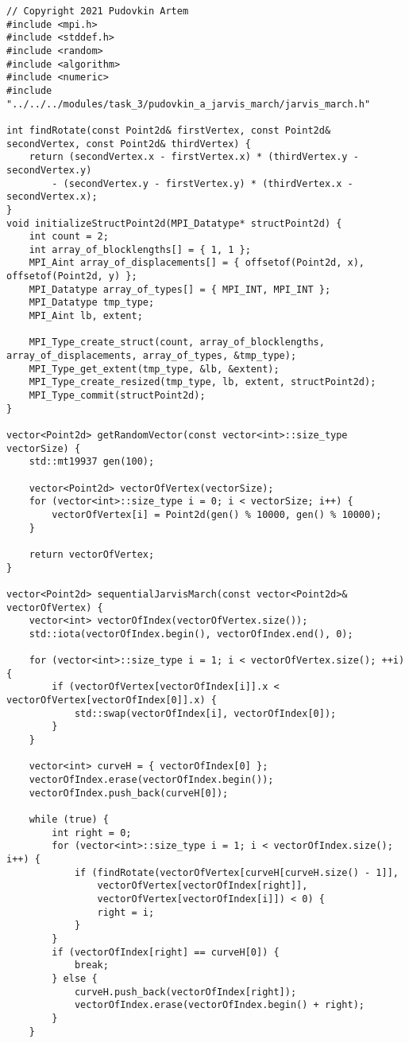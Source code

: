\documentclass{report}
\begin{document}
\begin{lstlisting}
// Copyright 2021 Pudovkin Artem
#include <mpi.h>
#include <stddef.h>
#include <random>
#include <algorithm>
#include <numeric>
#include "../../../modules/task_3/pudovkin_a_jarvis_march/jarvis_march.h"

int findRotate(const Point2d& firstVertex, const Point2d& secondVertex, const Point2d& thirdVertex) {
    return (secondVertex.x - firstVertex.x) * (thirdVertex.y - secondVertex.y)
        - (secondVertex.y - firstVertex.y) * (thirdVertex.x - secondVertex.x);
}
void initializeStructPoint2d(MPI_Datatype* structPoint2d) {
    int count = 2;
    int array_of_blocklengths[] = { 1, 1 };
    MPI_Aint array_of_displacements[] = { offsetof(Point2d, x), offsetof(Point2d, y) };
    MPI_Datatype array_of_types[] = { MPI_INT, MPI_INT };
    MPI_Datatype tmp_type;
    MPI_Aint lb, extent;

    MPI_Type_create_struct(count, array_of_blocklengths, array_of_displacements, array_of_types, &tmp_type);
    MPI_Type_get_extent(tmp_type, &lb, &extent);
    MPI_Type_create_resized(tmp_type, lb, extent, structPoint2d);
    MPI_Type_commit(structPoint2d);
}

vector<Point2d> getRandomVector(const vector<int>::size_type vectorSize) {
    std::mt19937 gen(100);

    vector<Point2d> vectorOfVertex(vectorSize);
    for (vector<int>::size_type i = 0; i < vectorSize; i++) {
        vectorOfVertex[i] = Point2d(gen() % 10000, gen() % 10000);
    }

    return vectorOfVertex;
}

vector<Point2d> sequentialJarvisMarch(const vector<Point2d>& vectorOfVertex) {
    vector<int> vectorOfIndex(vectorOfVertex.size());
    std::iota(vectorOfIndex.begin(), vectorOfIndex.end(), 0);

    for (vector<int>::size_type i = 1; i < vectorOfVertex.size(); ++i) {
        if (vectorOfVertex[vectorOfIndex[i]].x < vectorOfVertex[vectorOfIndex[0]].x) {
            std::swap(vectorOfIndex[i], vectorOfIndex[0]);
        }
    }

    vector<int> curveH = { vectorOfIndex[0] };
    vectorOfIndex.erase(vectorOfIndex.begin());
    vectorOfIndex.push_back(curveH[0]);

    while (true) {
        int right = 0;
        for (vector<int>::size_type i = 1; i < vectorOfIndex.size(); i++) {
            if (findRotate(vectorOfVertex[curveH[curveH.size() - 1]],
                vectorOfVertex[vectorOfIndex[right]],
                vectorOfVertex[vectorOfIndex[i]]) < 0) {
                right = i;
            }
        }
        if (vectorOfIndex[right] == curveH[0]) {
            break;
        } else {
            curveH.push_back(vectorOfIndex[right]);
            vectorOfIndex.erase(vectorOfIndex.begin() + right);
        }
    }


\end{lstlisting}
\end{document}
